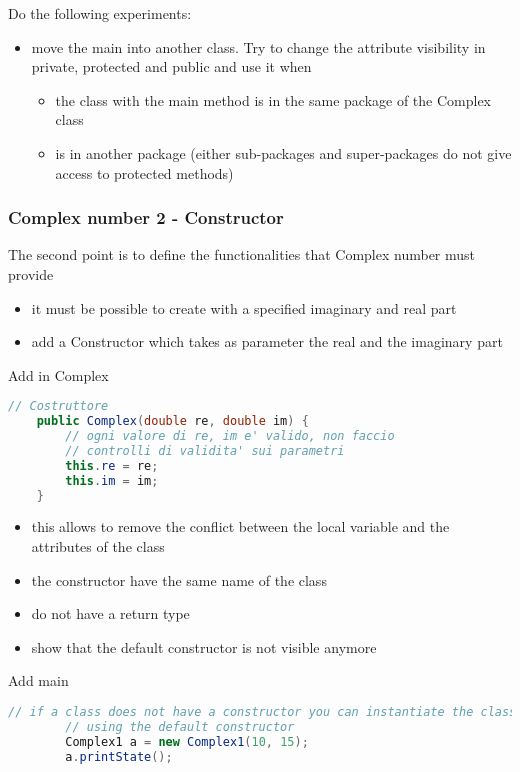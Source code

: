 \documentclass{article}
\begin{document}
Do the following experiments:
\begin{itemize}
\item move the main into another class. Try to change the attribute visibility in private, protected and public and use it when
\begin{itemize}
\item the class with the main method is in the same package of the Complex class
\item is in another package (either sub-packages and super-packages do not give access to protected methods)
\end{itemize}
\end{itemize}


\subsubsection{Complex number 2 - Constructor}
The second point is to define the functionalities that Complex number must provide
\begin{itemize}
\item it must be possible to create with a specified imaginary and real part 
\item add a Constructor which takes as parameter the real and the imaginary part
\end{itemize}
Add in Complex
\begin{lstlisting}[language=Java,escapechar=|]
    // Costruttore
	public Complex(double re, double im) {
		// ogni valore di re, im e' valido, non faccio
		// controlli di validita' sui parametri
		this.re = re;
		this.im = im;
	}

\end{lstlisting}
\begin{itemize}
\item this allows to remove the conflict between the local variable and the attributes of the class
\item the constructor have the same name of the class
\item do not have a return type
\item show that the default constructor is not visible anymore
\end{itemize}
Add main
\begin{lstlisting}[language=Java,escapechar=|]
		// if a class does not have a constructor you can instantiate the class
		// using the default constructor
		Complex1 a = new Complex1(10, 15);
		a.printState();
\end{lstlisting}
\end{document}
